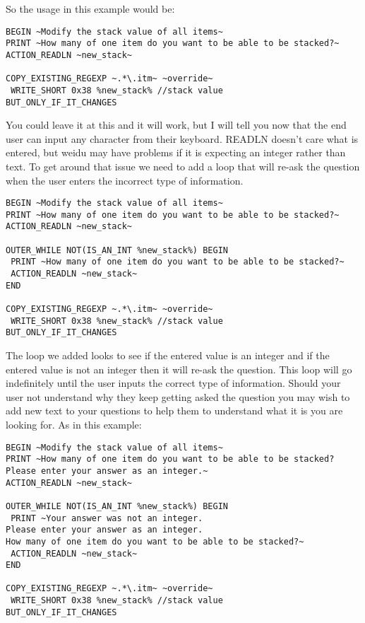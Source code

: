 \documentclass{article}
\begin{document}
So the usage in this example would be:

\begin{verbatim}
BEGIN ~Modify the stack value of all items~
PRINT ~How many of one item do you want to be able to be stacked?~
ACTION_READLN ~new_stack~

COPY_EXISTING_REGEXP ~.*\.itm~ ~override~
 WRITE_SHORT 0x38 %new_stack% //stack value
BUT_ONLY_IF_IT_CHANGES
\end{verbatim}

You could leave it at this and it will work, but I will tell you now that the end
user can input any character from their keyboard.  READLN doesn't care what is
entered, but weidu may have problems if it is expecting an integer rather than text.
To get around that issue we need to add a loop that will re-ask the question when the
user enters the incorrect type of information.

\begin{verbatim}
BEGIN ~Modify the stack value of all items~
PRINT ~How many of one item do you want to be able to be stacked?~
ACTION_READLN ~new_stack~

OUTER_WHILE NOT(IS_AN_INT %new_stack%) BEGIN
 PRINT ~How many of one item do you want to be able to be stacked?~
 ACTION_READLN ~new_stack~
END

COPY_EXISTING_REGEXP ~.*\.itm~ ~override~
 WRITE_SHORT 0x38 %new_stack% //stack value
BUT_ONLY_IF_IT_CHANGES
\end{verbatim}

The loop we added looks to see if the entered value is an integer and if the
entered value is not an integer then it will re-ask the question.  This loop
will go indefinitely until the user inputs the correct type of information.
Should your user not understand why they keep getting asked the question you may
wish to add new text to your questions to help them to understand what it is
you are looking for.  As in this example:

\begin{verbatim}
BEGIN ~Modify the stack value of all items~
PRINT ~How many of one item do you want to be able to be stacked?
Please enter your answer as an integer.~
ACTION_READLN ~new_stack~

OUTER_WHILE NOT(IS_AN_INT %new_stack%) BEGIN
 PRINT ~Your answer was not an integer.
Please enter your answer as an integer.
How many of one item do you want to be able to be stacked?~
 ACTION_READLN ~new_stack~
END

COPY_EXISTING_REGEXP ~.*\.itm~ ~override~
 WRITE_SHORT 0x38 %new_stack% //stack value
BUT_ONLY_IF_IT_CHANGES
\end{verbatim}
\end{document}

